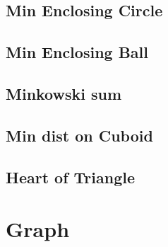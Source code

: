 \documentclass[a4paper,10pt,twocolumn,oneside]{article}
\begin{document}
\subsection{Min Enclosing Circle}


\subsection{Min Enclosing Ball}


%

\subsection{Minkowski sum}


% 

%

\subsection{Min dist on Cuboid}


\subsection{Heart of Triangle}


\section{Graph}
% 
\end{document}
